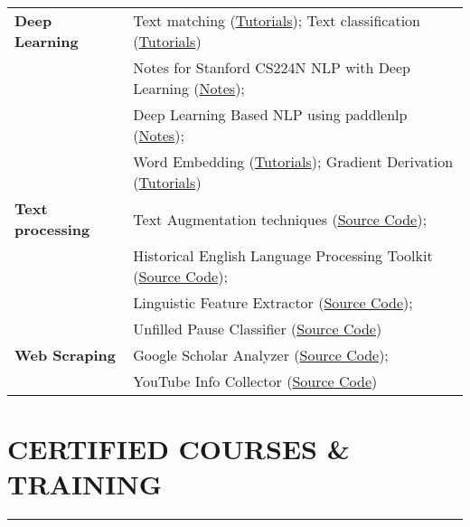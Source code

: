 \documentclass[a4paper, 11pt]{article}  %
\begin{document}
\begin{tabular}{@{} l l }
	
	\textbf{Deep Learning}  &  Text matching (\href{https://github.com/jaaack-wang/text-matching-explained}{Tutorials}); Text classification (\href{https://github.com/jaaack-wang/text-classification-explained}{Tutorials}) \\
		& Notes for Stanford CS224N NLP with Deep Learning (\href{https://github.com/jaaack-wang/Notes-for-Stanford-CS224N-NLP-with-Deep-Learning}{Notes}); \\ 
		& Deep Learning Based NLP using paddlenlp (\href{https://github.com/jaaack-wang/dl-nlp-using-paddlenlp}{Notes});  \\ 
		& Word Embedding (\href{https://github.com/jaaack-wang/dl-nlp-using-paddlenlp/tree/main/paddlenlp_updated_notes_English/WordEmbedding}{Tutorials}); Gradient Derivation (\href{https://github.com/jaaack-wang/hands-on-gradients-derivation-for-ml-dl-loss-func}{Tutorials}) \vspace{11pt} \\
		
	\textbf{Text processing} & Text Augmentation techniques (\href{https://github.com/jaaack-wang/text-augmentation-techniques}{Source Code}); \\ 
		& Historical English Language Processing Toolkit (\href{https://github.com/jaaack-wang/HELPtk}{Source Code}); \\ 
		& Linguistic Feature Extractor (\href{https://github.com/jaaack-wang/ling_feature_extractor}{Source Code}); \\ 
		& Unfilled Pause Classifier (\href{https://github.com/jaaack-wang/BASE_SLN_Pause_Project/blob/main/Scripts/pause_type_automation.py}{Source Code}) \vspace{11pt} \\

	\textbf{Web Scraping} & Google Scholar Analyzer (\href{https://github.com/jaaack-wang/GSchoolarAnalyzer}{Source Code}); \\ 
		& YouTube Info Collector (\href{https://github.com/jaaack-wang/YouTubeInfoCollector}{Source Code})
	
\end{tabular}

\section*{CERTIFIED COURSES \& TRAINING}
\hrule 
\vspace{11pt}
\end{document}
